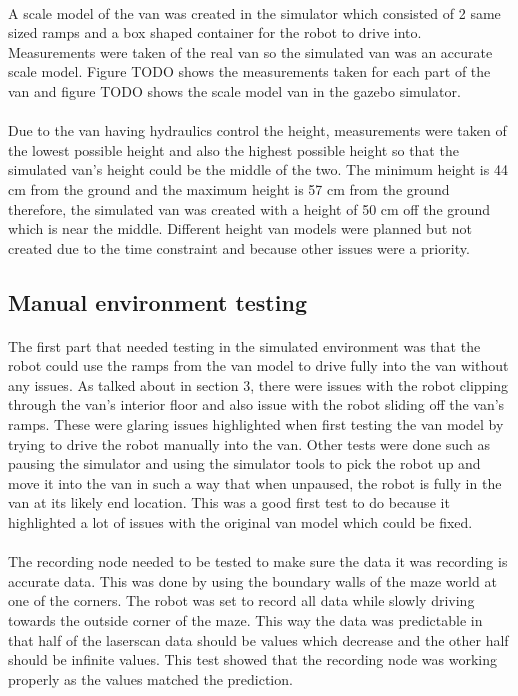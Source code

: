 \paragraph{}
A scale model of the van was created in the simulator which consisted of 2 same sized ramps and a box shaped container for the robot to drive into. Measurements were taken of the real van so the simulated van was an accurate scale model. Figure TODO shows the measurements taken for each part of the van and figure TODO shows the scale model van in the gazebo simulator.

\paragraph{}
Due to the van having hydraulics control the height, measurements were taken of the lowest possible height and also the highest possible height so that the simulated van's height could be the middle of the two. The minimum height is 44 cm from the ground and the maximum height is 57 cm from the ground therefore, the simulated van was created with a height of 50 cm off the ground which is near the middle. Different height van models were planned but not created due to the time constraint and because other issues were a priority.


\subsection{Manual environment testing}
\paragraph{}
The first part that needed testing in the simulated environment was that the robot could use the ramps from the van model to drive fully into the van without any issues. As talked about in section 3, there were issues with the robot clipping through the van's interior floor and also issue with the robot sliding off the van's ramps. These were glaring issues highlighted when first testing the van model by trying to drive the robot manually into the van. Other tests were done such as pausing the simulator and using the simulator tools to pick the robot up and move it into the van in such a way that when unpaused, the robot is fully in the van at its likely end location. This was a good first test to do because it highlighted a lot of issues with the original van model which could be fixed.

\paragraph{}
The recording node needed to be tested to make sure the data it was recording is accurate data. This was done by using the boundary walls of the maze world at one of the corners. The robot was set to record all data while slowly driving towards the outside corner of the maze. This way the data was predictable in that half of the laserscan data should be values which decrease and the other half should be infinite values. This test showed that the recording node was working properly as the values matched the prediction.

